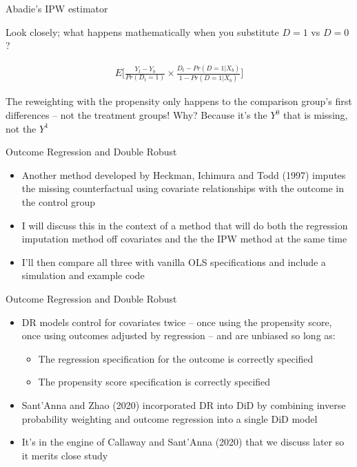 \documentclass{beamer}
\begin{document}
\begin{frame}{Abadie's IPW estimator}

Look closely; what happens mathematically when you substitute $D=1$ vs $D=0$?

\begin{eqnarray*}
E\bigg [ \frac{Y_t - Y_b}{Pr(D_t=1)} \times \frac{D_t - Pr(D=1|X_b)}{1-Pr(D=1|X_b)} \bigg ]
\end{eqnarray*}

\bigskip

The reweighting with the propensity only happens to the comparison group's first differences -- not the treatment groups!  Why?  Because it's the $Y^0$ that is missing, not the $Y^1$

\end{frame}









\begin{frame}{Outcome Regression and Double Robust}

\begin{itemize}
\item Another method developed by Heckman, Ichimura and Todd (1997) imputes the missing counterfactual using covariate relationships with the outcome in the control group
\item I will discuss this in the context of a method that will do both the regression imputation method off covariates and the the IPW method at the same time
\item I'll then compare all three with vanilla OLS specifications and include a simulation and example code

\end{itemize}
\end{frame}

\begin{frame}{Outcome Regression and Double Robust}

\begin{itemize}
\item DR models control for covariates twice -- once using the propensity score, once using outcomes adjusted by regression -- and are unbiased so long as:
	\begin{itemize}
	\item The regression specification for the outcome is correctly specified
	\item The propensity score specification is correctly specified
	\end{itemize}
\item Sant'Anna and Zhao (2020) incorporated DR into DiD by combining inverse probability weighting and outcome regression into a single DiD model
\item It's in the engine of Callaway and Sant'Anna (2020) that we discuss later so it merits close study
\end{itemize}

\end{frame}
\end{document}
